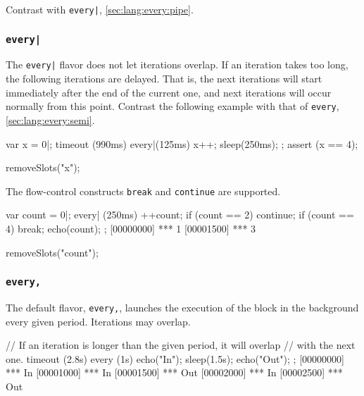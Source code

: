 Contrast with \lstinline{every|}, \autoref{sec:lang:every:pipe}.

\subsubsection{\lstinline{every|}}
\label{sec:lang:every:pipe}

The \lstinline{every|} flavor does not let iterations overlap. If an
iteration takes too long, the following iterations are delayed. That is, the
next iterations will start immediately after the end of the current one, and
next iterations will occur normally from this point.  Contrast the following
example with that of \lstinline{every}, \autoref{sec:lang:every:semi}.

\begin{urbiscript}
var x = 0|;
timeout (990ms)
  every|(125ms)
  {
    x++;
    sleep(250ms);
  };
assert (x == 4);
\end{urbiscript}
\begin{urbicomment}
removeSlots("x");
\end{urbicomment}

The flow-control constructs \lstinline{break} and \lstinline{continue}
are supported.

\begin{urbiscript}
var count = 0|;
every| (250ms)
{
  ++count;
  if (count == 2)
    continue;
  if (count == 4)
    break;
  echo(count);
};
[00000000] *** 1
[00001500] *** 3
\end{urbiscript}
\begin{urbicomment}
removeSlots("count");
\end{urbicomment}



\subsubsection{\lstinline{every,}}
\label{sec:lang:every:comma}
The default flavor, \lstinline|every,|, launches the execution of the
block in the background every given period. Iterations may overlap.

\begin{urbiscript}[firstnumber=1]
// If an iteration is longer than the given period, it will overlap
// with the next one.
timeout (2.8s)
  every (1s)
  {
    echo("In");
    sleep(1.5s);
    echo("Out");
  };
[00000000] *** In
[00001000] *** In
[00001500] *** Out
[00002000] *** In
[00002500] *** Out
\end{urbiscript}

